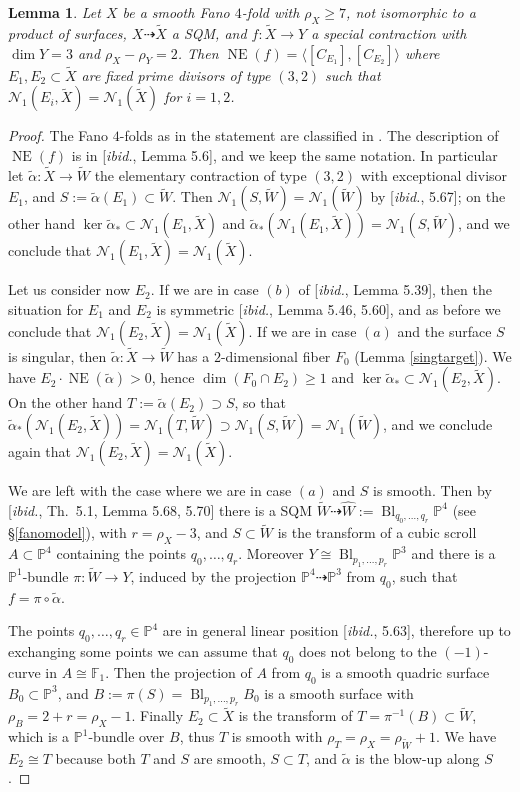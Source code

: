 \documentclass[a4paper,12pt]{amsart}
\newtheorem{lemma}[thm]{Lemma}
\theoremstyle{definition}
\numberwithin{figure}{section}
\numberwithin{table}{section}
\newcommand{\w}{\widetilde}
\newcommand{\wi}{\widehat}
\newcommand{\pr}{\mathbb{P}}
\newcommand{\N}{\mathcal{N}_1}
\newcommand{\NE}{\operatorname{NE}}
\newcommand{\Bl}{\operatorname{Bl}}
\begin{document}
\begin{lemma}\label{classification}
  Let $X$ be a smooth Fano $4$-fold with $\rho_X\geq 7$, not isomorphic to a product of surfaces, $X\dasharrow \w{X}$ a SQM, and $f\colon \w{X}\to Y$ a special contraction with $\dim Y=3$ and $\rho_X-\rho_Y=2$.
  Then  $\NE(f)=\langle [C_{E_1}],[C_{E_2}]\rangle$ where  $E_1,E_2\subset \w{X}$  are  fixed prime divisors of type $(3,2)$ such that
  $\N(E_i,\w{X})=\N(\w{X})$ for $i=1,2$.
\end{lemma}
\begin{proof}
  The Fano $4$-folds as in the statement are classified in \cite[Th.~5.1]{3folds}.
  The description of $\NE(f)$ is in [\emph{ibid.}, Lemma 5.6], and we keep the same notation. In particular
  let $\tilde\alpha\colon\w{X}\to \w{W}$ the elementary contraction of type $(3,2)$ with exceptional divisor $E_1$, and $S:=\tilde\alpha(E_1)\subset \w{W}$. Then 
  $\N(S,\w{W})=\N(\w{W})$ by [\emph{ibid.}, 5.67]; on the other hand
  $\ker\tilde\alpha_*\subset \N(E_1,\w{X})$ and $\tilde\alpha_*(\N(E_1,\w{X}))=
  \N(S,\w{W})$, and we conclude that $\N(E_1,\w{X})=\N(\w{X})$.
  
  Let us consider now $E_2$. If we are in case $(b)$ of [\emph{ibid.}, Lemma 5.39], then the situation for $E_1$ and $E_2$ is symmetric [\emph{ibid.}, Lemma 5.46, 5.60], and as before we conclude that $\N(E_2,\w{X})=\N(\w{X})$. If we are in case $(a)$ and the surface $S$ is singular, then $\tilde\alpha\colon\w{X}\to\w{W}$ has a $2$-dimensional fiber $F_0$ (Lemma \ref{singtarget}). We have $E_2\cdot\NE(\tilde\alpha)>0$, hence $\dim(F_0\cap E_2)\geq 1$ and $\ker\tilde\alpha_*\subset\N(E_2,\w{X})$. On the other hand $T:=\tilde\alpha(E_2)\supset S$, so that $\tilde\alpha_*(\N(E_2,\w{X}))=\N(T,\w{W})\supset\N(S,\w{W})=\N(\w{W})$, and we conclude again that $\N(E_2,\w{X})=\N(\w{X})$.

  We are left with the case where we are in case $(a)$ and $S$ is smooth.
  Then by [\emph{ibid.}, Th.~5.1, Lemma 5.68, 5.70] there is a SQM $\w{W}\dasharrow\wi{W}:=\Bl_{q_0,\dotsc,q_r}\pr^4$ (see \S\ref{fanomodel}), with $r=\rho_X-3$, and $S\subset \w{W}$ is the transform of a cubic scroll $A\subset\pr^4$ containing the points $q_0,\dotsc,q_r$. Moreover $Y\cong\Bl_{p_1,\dotsc,p_r}\pr^3$ and there is a $\pr^1$-bundle $\pi\colon \w{W}\to Y$, induced by the projection $\pr^4\dasharrow\pr^3$ from $q_0$, such that $f=\pi\circ\tilde\alpha$.

  The points $q_0,\dotsc,q_r\in\pr^4$ are in general linear position [\emph{ibid.}, 5.63], therefore up to exchanging some points we can assume that $q_0$ does not belong to the $(-1)$-curve in $A\cong\mathbb{F}_1$. Then the projection of $A$ from $q_0$ is a smooth quadric surface $B_0\subset\pr^3$, and $B:=\pi(S)=\Bl_{p_1,\dotsc,p_r}B_0$ is a smooth surface with $\rho_B=2+r=\rho_X-1$. Finally $E_2\subset\w{X}$ is the transform of $T=\pi^{-1}(B)\subset\w{W}$, which is a $\pr^1$-bundle over $B$, thus $T$ is smooth with $\rho_T=\rho_X=\rho_{\w{W}}+1$. We have $E_2\cong T$ because
  both $T$ and $S$ are smooth,  $S\subset T$, and $\tilde\alpha$ is the blow-up along $S$.


\end{proof}
\end{document}
